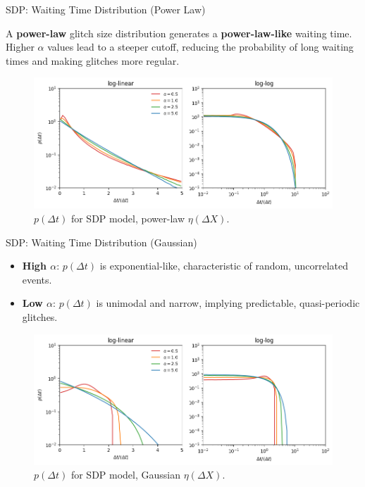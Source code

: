 \begin{frame}{SDP: Waiting Time Distribution (Power Law)}

    A \textbf{power-law} glitch size distribution generates a \textbf{power-law-like} waiting time. Higher $\alpha$ values lead to a steeper cutoff, reducing the probability of long waiting times and making glitches more regular.

    \begin{figure}
        \centering
        \includegraphics[width=0.85\linewidth]{assets/wtd_powerlaw_sdp.png}
        \vspace{-1em}
        \caption{$p(\Delta t)$ for SDP model, power-law $\eta(\Delta X)$.}
    \end{figure}
\end{frame}

\begin{frame}{SDP: Waiting Time Distribution (Gaussian)}
    \setlength{\leftmargini}{0.5em}
    \small
    \vspace{-0.5em}
    \begin{itemize}
        \item \textbf{High $\alpha$}: $p(\Delta t)$ is exponential-like, characteristic of random, uncorrelated events.
        \item \textbf{Low $\alpha$}: $p(\Delta t)$ is unimodal and narrow, implying predictable, quasi-periodic glitches.
    \end{itemize}

    \vspace{-0.5em}
    \begin{figure}
        \centering
        \includegraphics[width=0.85\linewidth]{assets/wtd_gaussian_sdp.png}
        \vspace{-1em}
        \caption{$p(\Delta t)$ for SDP model, Gaussian $\eta(\Delta X)$.}
    \end{figure}
\end{frame}

